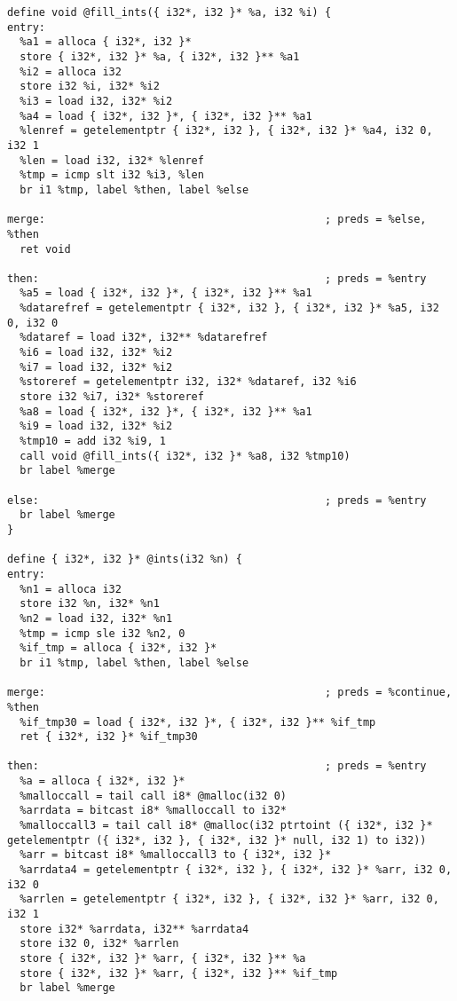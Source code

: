 \documentclass[main.tex]{subfiles}
\begin{document}
{\begin{lstlisting}
define void @fill_ints({ i32*, i32 }* %a, i32 %i) {
entry:
  %a1 = alloca { i32*, i32 }*
  store { i32*, i32 }* %a, { i32*, i32 }** %a1
  %i2 = alloca i32
  store i32 %i, i32* %i2
  %i3 = load i32, i32* %i2
  %a4 = load { i32*, i32 }*, { i32*, i32 }** %a1
  %lenref = getelementptr { i32*, i32 }, { i32*, i32 }* %a4, i32 0, i32 1
  %len = load i32, i32* %lenref
  %tmp = icmp slt i32 %i3, %len
  br i1 %tmp, label %then, label %else

merge:                                            ; preds = %else, %then
  ret void

then:                                             ; preds = %entry
  %a5 = load { i32*, i32 }*, { i32*, i32 }** %a1
  %datarefref = getelementptr { i32*, i32 }, { i32*, i32 }* %a5, i32 0, i32 0
  %dataref = load i32*, i32** %datarefref
  %i6 = load i32, i32* %i2
  %i7 = load i32, i32* %i2
  %storeref = getelementptr i32, i32* %dataref, i32 %i6
  store i32 %i7, i32* %storeref
  %a8 = load { i32*, i32 }*, { i32*, i32 }** %a1
  %i9 = load i32, i32* %i2
  %tmp10 = add i32 %i9, 1
  call void @fill_ints({ i32*, i32 }* %a8, i32 %tmp10)
  br label %merge

else:                                             ; preds = %entry
  br label %merge
}

define { i32*, i32 }* @ints(i32 %n) {
entry:
  %n1 = alloca i32
  store i32 %n, i32* %n1
  %n2 = load i32, i32* %n1
  %tmp = icmp sle i32 %n2, 0
  %if_tmp = alloca { i32*, i32 }*
  br i1 %tmp, label %then, label %else

merge:                                            ; preds = %continue, %then
  %if_tmp30 = load { i32*, i32 }*, { i32*, i32 }** %if_tmp
  ret { i32*, i32 }* %if_tmp30

then:                                             ; preds = %entry
  %a = alloca { i32*, i32 }*
  %malloccall = tail call i8* @malloc(i32 0)
  %arrdata = bitcast i8* %malloccall to i32*
  %malloccall3 = tail call i8* @malloc(i32 ptrtoint ({ i32*, i32 }* getelementptr ({ i32*, i32 }, { i32*, i32 }* null, i32 1) to i32))
  %arr = bitcast i8* %malloccall3 to { i32*, i32 }*
  %arrdata4 = getelementptr { i32*, i32 }, { i32*, i32 }* %arr, i32 0, i32 0
  %arrlen = getelementptr { i32*, i32 }, { i32*, i32 }* %arr, i32 0, i32 1
  store i32* %arrdata, i32** %arrdata4
  store i32 0, i32* %arrlen
  store { i32*, i32 }* %arr, { i32*, i32 }** %a
  store { i32*, i32 }* %arr, { i32*, i32 }** %if_tmp
  br label %merge


\end{lstlisting}}
\end{document}
